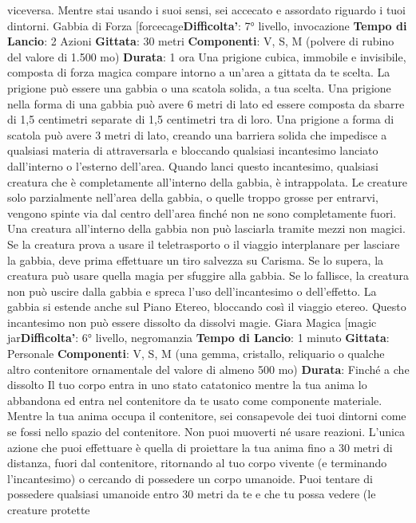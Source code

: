\begin{multicols}{2}
viceversa. Mentre stai usando i suoi sensi, sei accecato
e assordato riguardo i tuoi dintorni.
Gabbia di Forza
[forcecage\textbf{Difficolta'}:
7° livello, invocazione
\textbf{Tempo di Lancio}: 2 Azioni
\textbf{Gittata}: 30 metri
\textbf{Componenti}: V, S, M (polvere di rubino del valore di
1.500 mo)
\textbf{Durata}: 1 ora
Una prigione cubica, immobile e invisibile, composta di
forza magica compare intorno a un’area a gittata da te
scelta. La prigione può essere una gabbia o una scatola
solida, a tua scelta.
Una prigione nella forma di una gabbia può avere 6
metri di lato ed essere composta da sbarre di 1,5
centimetri separate di 1,5 centimetri tra di loro.
Una prigione a forma di scatola può avere 3 metri di
lato, creando una barriera solida che impedisce a
qualsiasi materia di attraversarla e bloccando qualsiasi
incantesimo lanciato dall’interno o l’esterno dell’area.
Quando lanci questo incantesimo, qualsiasi creatura
che è completamente all’interno della gabbia, è
intrappolata. Le creature solo parzialmente nell’area
della gabbia, o quelle troppo grosse per entrarvi,
vengono spinte via dal centro dell’area finché non ne
sono completamente fuori.
Una creatura all’interno della gabbia non può lasciarla
tramite mezzi non magici. Se la creatura prova a usare
il teletrasporto o il viaggio interplanare per lasciare la
gabbia, deve prima effettuare un tiro salvezza su
Carisma. Se lo supera, la creatura può usare quella
magia per sfuggire alla gabbia. Se lo fallisce, la
creatura non può uscire dalla gabbia e spreca l’uso
dell’incantesimo o dell’effetto. La gabbia si estende
anche sul Piano Etereo, bloccando così il viaggio
etereo.
Questo incantesimo non può essere dissolto da dissolvi
magie.
Giara Magica
[magic jar\textbf{Difficolta'}:
6° livello, negromanzia
\textbf{Tempo di Lancio}: 1 minuto
\textbf{Gittata}: Personale
\textbf{Componenti}: V, S, M (una gemma, cristallo, reliquario
o qualche altro contenitore ornamentale del valore di
almeno 500 mo)
\textbf{Durata}: Finché a che dissolto
Il tuo corpo entra in uno stato catatonico mentre la tua
anima lo abbandona ed entra nel contenitore da te
usato come componente materiale. Mentre la tua anima
occupa il contenitore, sei consapevole dei tuoi dintorni
come se fossi nello spazio del contenitore. Non puoi
muoverti né usare reazioni. L’unica azione che puoi
effettuare è quella di proiettare la tua anima fino a 30
metri di distanza, fuori dal contenitore, ritornando al tuo
corpo vivente (e terminando l’incantesimo) o cercando
di possedere un corpo umanoide.
Puoi tentare di possedere qualsiasi umanoide entro 30
metri da te e che tu possa vedere (le creature protette

\end{multicols}
